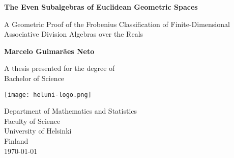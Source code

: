 \begin{titlepage}
    \begin{center}
        \vspace*{1cm}
            
        \Huge
        \textbf{The Even Subalgebras of Euclidean Geometric Spaces}
            
        \vspace{0.5cm}
        \LARGE
		A Geometric Proof of the Frobenius Classification of Finite-Dimensional Associative Division Algebras over the Reals
            
        \vspace{1.5cm}
            
        \textbf{Marcelo Guimarães Neto}
            
        \vfill
            
        A thesis presented for the degree of\\
        Bachelor of Science
            
        \vspace{0.8cm}
            
        \texttt{[image: heluni-logo.png]}
        
        \vspace{0.8cm}
            
        \Large
        Department of Mathematics and Statistics\\
        Faculty of Science\\
        University of Helsinki\\
        Finland\\
        \today
            
    \end{center}
\end{titlepage}
